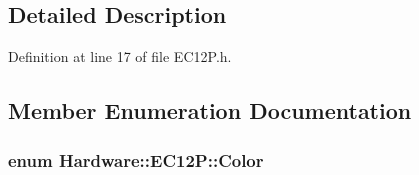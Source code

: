 \subsection{Detailed Description}


Definition at line 17 of file E\+C12\+P.\+h.



\subsection{Member Enumeration Documentation}
\hypertarget{class_hardware_1_1_e_c12_p_a8341f410cd939bf03160fe239bc782aa}{}
\subsubsection[{Color}]{\setlength{\rightskip}{0pt plus 5cm}enum {\bf Hardware\+::\+E\+C12\+P\+::\+Color}}\label{class_hardware_1_1_e_c12_p_a8341f410cd939bf03160fe239bc782aa}

